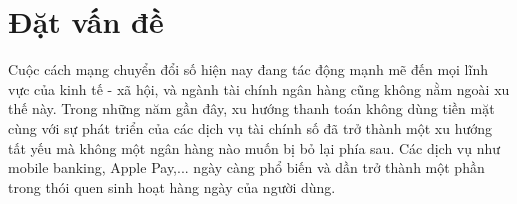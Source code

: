 \documentclass[../DoAn.tex]{subfiles}
\begin{document}





\section{Đặt vấn đề}
\label{section:1.1}

Cuộc cách mạng chuyển đổi số hiện nay đang tác động mạnh mẽ đến mọi lĩnh vực của kinh tế - xã hội, và ngành tài chính ngân hàng cũng không nằm ngoài xu thế này. Trong những năm gần đây, xu hướng thanh toán không dùng tiền mặt cùng với sự phát triển của các dịch vụ tài chính số đã trở thành một xu hướng tất yếu mà không một ngân hàng nào muốn bị bỏ lại phía sau. Các dịch vụ như mobile banking, Apple Pay,... ngày càng phổ biến và dần trở thành một phần trong thói quen sinh hoạt hàng ngày của người dùng.
\end{document}
